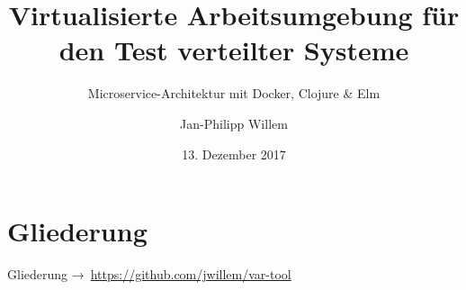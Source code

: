 \documentclass[compress]{beamer}
\title{Virtualisierte Arbeitsumgebung für den Test verteilter Systeme}
\subtitle{Microservice-Architektur mit Docker, Clojure \& Elm}
\author{Jan-Philipp Willem}
\institute{Fakultät für Informatik\\Hochschule Mannheim}
\date{13. Dezember 2017}
\begin{document}

\maketitle


\section*{Gliederung}
\begin{frame}{Gliederung}
  \tableofcontents[hideallsubsections]
  →~{\color{orange}\url{https://github.com/jwillem/var-tool}}
\end{frame}
\end{document}
